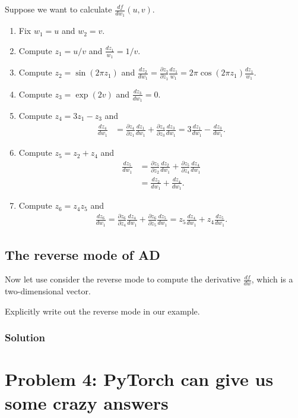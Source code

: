 \documentclass[letterpaper,11pt]{article}
\begin{document}
Suppose we want to calculate $\frac{df}{dw_1}(u,v)$.

\begin{enumerate}
\item Fix $w_1 = u$ and $w_2 = v$.
\item Compute $z_1 = u/v$ and $\frac{dz_1}{w_1} = 1/v$.
\item Compute $z_2 = \sin\left(2\pi z_1\right)$ and $\frac{dz_2}{dw_1} = \frac{\partial z_2}{\partial z_1}\frac{dz_1}{w_1} = 2\pi\cos\left(2\pi z_1\right)\frac{dz_1}{w_1}$.
\item Compute $z_3 = \exp\left(2v\right)$ and $\frac{dz_3}{dw_1} = 0$.
\item Compute $z_4 = 3z_1 - z_3$ and
\begin{align*}
  \frac{dz_4}{dw_1}
  &= \frac{\partial z_4}{\partial z_1}\frac{dz_1}{dw_1} + \frac{\partial z_4}{\partial z_3}\frac{dz_3}{dw_1} = 3\frac{dz_1}{dw_1} - \frac{dz_3}{dw_1}.
\end{align*}
\item Compute
  $z_5 = z_2 + z_4$ and
  \begin{align*}
  \frac{dz_5}{dw_1}
    &= \frac{\partial z_5}{\partial z_2}\frac{dz_2}{dw_1} + \frac{\partial z_5}{\partial z_4}\frac{dz_4}{dw_1} \\
    &= \frac{dz_2}{dw_1} + \frac{dz_4}{dw_1}.
  \end{align*}
\item Compute $z_6 = z_4z_5$ and
  \begin{align*}
    \frac{dz_6}{dw_1} = \frac{\partial z_6}{\partial z_4}\frac{dz_4}{dw_1} +
    \frac{\partial z_6}{\partial z_5}\frac{dz_5}{dw_1} = z_5\frac{dz_4}{dw_1} +
    z_4\frac{dz_5}{dw_1}.
  \end{align*}
\end{enumerate}

\subsection*{The reverse mode of AD}

Now let use consider the reverse mode to compute the derivative
$\frac{df}{dw}$, which is a two-dimensional vector.

Explicitly write out the reverse mode in our example.

\subsubsection*{Solution}

\section*{Problem 4: PyTorch can give us some crazy answers}
\end{document}
